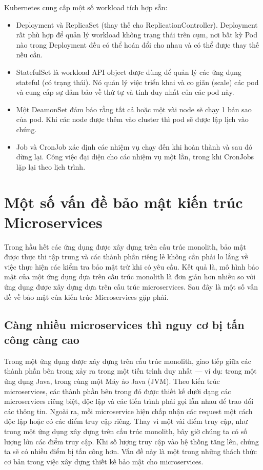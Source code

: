 \documentclass[12pt,a4paper]{report}
\begin{document}
				Kubernetes cung cấp một số workload tích hợp sẵn:
				\begin{itemize}				
					\item Deployment và ReplicaSet (thay thế cho ReplicationController). Deployment rất phù hợp để quản lý workload không trạng thái trên cụm, nơi bất kỳ Pod nào trong Deployment đều có thể hoán đổi cho nhau và có thể được thay thế nếu cần.
					\item StatefulSet là workload API object được dùng để quản lý các ứng dụng stateful (có trạng thái). Nó quản lý việc triển khai và co giãn (scale) các pod và cung cấp sự đảm bảo về thứ tự và tính duy nhất của các pod này.
					\item  Một DeamonSet đảm bảo rằng tất cả hoặc một vài node sẽ chạy 1 bản sao của pod. Khi các node được thêm vào cluster thì pod sẽ được lập lịch vào chúng.
					\item  Job và CronJob xác định các nhiệm vụ chạy đến khi hoàn thành và sau đó dừng lại. Công việc đại diện cho các nhiệm vụ một lần, trong khi CronJobs lặp lại theo lịch trình.
				\end{itemize}
	\section{Một số vấn đề bảo mật kiến trúc Microservices}
			{\hspace{0.6cm}Trong hầu hết các ứng dụng được xây dựng trên cấu trúc monolith, bảo mật được thực thi tập trung và các thành phần riêng lẻ không cần phải lo lắng về việc thực hiện các kiểm tra bảo mật trừ khi có yêu cầu. Kết quả là, mô hình bảo mật của một ứng dụng dựa trên cấu trúc monolith là đơn giản hơn nhiều so với ứng dụng được xây dựng dựa trên cấu trúc microservices. Sau đây là một số vấn đề về bảo mật của kiến trúc Microservices gặp phải.\\}			
		\subsection{Càng nhiều microservices thì nguy cơ bị tấn công càng cao}
				{\hspace{0.6cm}Trong một ứng dụng được xây dựng trên cấu trúc monolith, giao tiếp giữa các thành phần bên trong xảy ra trong một tiến trình duy nhất — ví dụ: trong một ứng dụng Java, trong cùng một Máy ảo Java (JVM). Theo kiến trúc microservices, các thành phần bên trong đó được thiết kế dưới dạng các microservices riêng biệt, độc lập và các tiến trình phải gọi lẫn nhau để trao đổi các thông tin. Ngoài ra, mỗi microservice hiện chấp nhận các request một cách độc lập hoặc có các điểm truy cập riêng. Thay vì một vài điểm truy cập, như trong một ứng dụng xây dựng trên cấu trúc monolith, bây giờ chúng ta có số lượng lớn các điểm truy cập. Khi số lượng truy cập vào hệ thống tăng lên, chúng ta sẽ có nhiều điểm bị tấn công hơn. Vấn đề này là một trong những thách thức cơ bản trong việc xây dựng thiết kế bảo mật cho microservices.\\}
\end{document}
